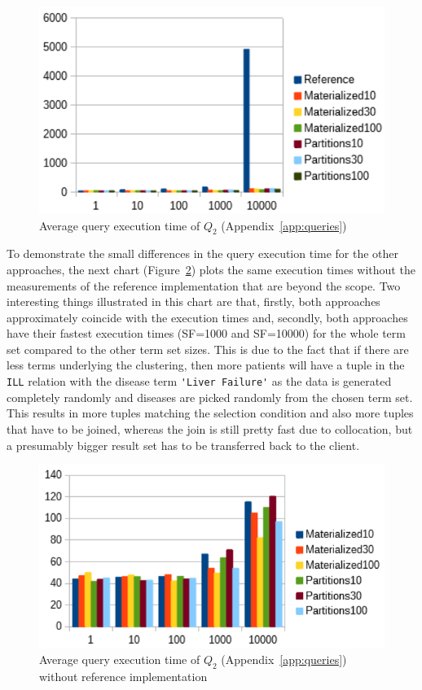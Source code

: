\begin{figure}[h]
    \centering
    \includegraphics[scale=0.9]{charts/Query2.pdf}
    \caption{Average query execution time of $Q_2$ (Appendix~\ref{app:queries})}
    \label{fig:query2}
\end{figure}

To demonstrate the small differences in the query execution time for the other approaches, the next chart (Figure~\ref{fig:query2withoutref}) plots the same
execution times without the measurements of the reference implementation that are beyond the scope. Two interesting things illustrated in this chart are that,
firstly, both approaches approximately coincide with the execution times and, secondly, both approaches have their fastest execution times (SF=1000 and
SF=10000) for the whole term set compared to the other term set sizes. This is due to the fact that if there are less terms underlying the clustering, then 
more patients will have a tuple in the \verb!ILL! relation with the disease term \verb!'Liver Failure'! as the data is generated completely randomly and
diseases are picked randomly from the chosen term set. This results in more tuples matching the selection condition and also more tuples that have to be joined,
whereas the join is still pretty fast due to collocation, but a presumably bigger result set has to be transferred back to the client.

\begin{figure}[h]
    \centering
    \includegraphics[scale=0.9]{charts/Query2WithoutReference.pdf}
    \caption{Average query execution time of $Q_2$ (Appendix~\ref{app:queries}) without reference implementation}
    \label{fig:query2withoutref}
\end{figure}


